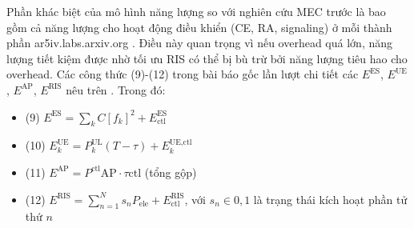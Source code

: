 Phần khác biệt của mô hình năng lượng so với nghiên cứu MEC trước là bao gồm cả năng lượng cho hoạt động điều khiển (CE, RA, signaling) ở mỗi thành phần
ar5iv.labs.arxiv.org
. Điều này quan trọng vì nếu overhead quá lớn, năng lượng tiết kiệm được nhờ tối ưu RIS có thể bị bù trừ bởi năng lượng tiêu hao cho overhead. Các công thức (9)-(12) trong bài báo gốc lần lượt chi tiết các $E^\text{ES}$, $E^\text{UE}$, $E^\text{AP}$, $E^\text{RIS}$ nêu trên
\cite{ris_latency}
. Trong đó:
\begin{itemize}
    \item (9) $E^\text{ES} = \sum_k C [f_k]^2 + E^\text{ES}_\text{ctl}$
    \item (10) $E^\text{UE}_k = P^\text{UL}_k (T-\tau) + E^\text{UE,ctl}_k$
    \item (11) $E^\text{AP} = P^\text{ctl}\text{AP} \cdot \tau\text{ctl}$ (tổng gộp)
    \item (12) $E^\text{RIS} = \sum_{n=1}^N s_n P_\text{ele} + E^\text{RIS}_\text{ctl}$, với $s_n \in{0,1}$ là trạng thái kích hoạt phần tử thứ $n$
\end{itemize}